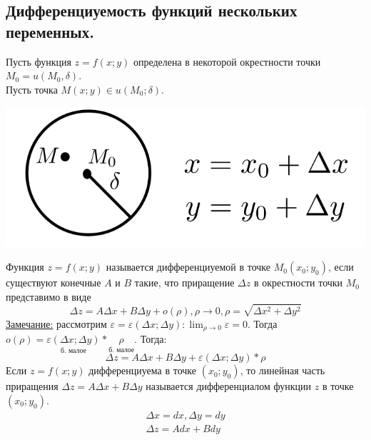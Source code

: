 \documentclass[12pt]{article}
\let\ORIincludegraphics\includegraphics
\renewcommand{\includegraphics}[2][]{\ORIincludegraphics[scale=0.65,#1]{#2}}
\begin{document}
    \subsection{Дифференциуемость функций нескольких переменных.}\noindent
    Пусть функция $z = f(x;y)$ определена в некоторой окрестности точки $M_0 = u(M_0, \delta)$.\\
    Пусть точка $M (x; y) \in u(M_0; \delta)$.
    \begin{center}
        \includegraphics{7.5.1.png}
    \end{center}
    Функция $z = f(x;y)$ называется дифференциуемой в точке $M_0 (x_0; y_0)$, если существуют конечные $A$ и $B$ такие, что приращение $\Delta z$ в окрестности точки $M_0$ представимо в виде
    \[ \Delta z = A \Delta x + B \Delta y + o(\rho), \rho \to 0, \rho = \sqrt{\Delta x^2 + \Delta y^2} \]
    \underline{Замечание:} рассмотрим $\varepsilon = \varepsilon (\Delta x; \Delta y): \lim_{\rho \to 0}\varepsilon = 0$. Тогда $o(\rho) = \underset{\text{б. малое}}{\varepsilon(\Delta x; \Delta y)} * \underset{\text{б. малое}}{\rho}$. Тогда:
    \[ \Delta z = A \Delta x + B \Delta y + \varepsilon (\Delta x; \Delta y) * \rho \]
    Если $z = f(x; y)$ дифференциуема в точке $(x_0; y_0)$, то линейная часть приращения $\Delta z = A \Delta x + B \Delta y$ называется дифференциалом функции $z$ в точке $(x_0; y_0)$.
    \begin{gather*}
        \Delta x = dx, \Delta y = dy\\
        \Delta z = Adx + Bdy
    \end{gather*}
\end{document}
